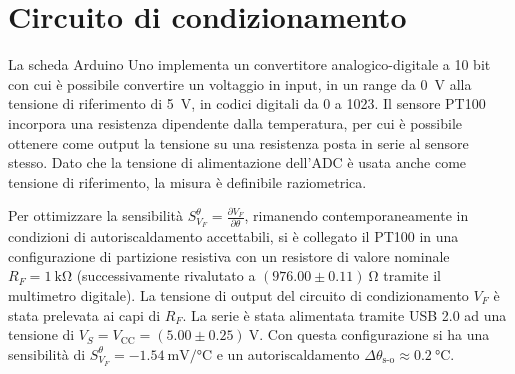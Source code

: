 \documentclass{article}
\begin{document}
\section{Circuito di condizionamento}
La scheda Arduino Uno implementa un convertitore analogico-digitale a 10 bit con cui è possibile convertire un voltaggio in input, in un range da \SI{0}{\volt} alla tensione di riferimento di \SI{5}{\volt}, in codici digitali da 0 a 1023. 
Il sensore PT100 incorpora una resistenza dipendente dalla temperatura, per cui è possibile ottenere come output la tensione su una resistenza posta in serie al sensore stesso.
Dato che la tensione di alimentazione dell'ADC è usata anche come tensione di riferimento, la misura è definibile raziometrica.

Per ottimizzare la sensibilità $S_{V_F}^{\theta}=\frac{\partial{V_F}}{\partial{\theta}}$, rimanendo contemporaneamente in condizioni di autoriscaldamento accettabili, si è collegato il PT100 in una configurazione di partizione resistiva con un resistore di valore nominale $R_F=\SI{1}{\kilo\ohm}$ (successivamente rivalutato a $(976.00\pm0.11)\SI{}{\ohm}$ tramite il multimetro digitale). La tensione di output del circuito di condizionamento $V_F$ è stata prelevata ai capi di $R_F$.
La serie è stata alimentata tramite USB 2.0 ad una tensione di $V_S=V_\text{CC}=(5.00\pm0.25)\SI{}{\volt}$.
Con questa configurazione si ha una sensibilità di $S_{V_F}^{\theta}=\SI{-1.54}{\milli\volt\per\celsius}$ e un autoriscaldamento $\Delta\theta_{\text{s-o}}\approx\SI{0.2}{\celsius}$.
\end{document}
